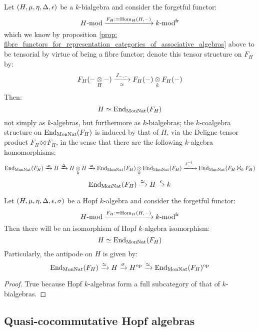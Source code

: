         \begin{proposition} \label{prop: fibre_functors_for_representation_categories_of_bialgebras}
            Let $(H, \mu, \eta, \Delta, \epsilon)$ be a $k$-bialgebra and consider the forgetful functor:
                $$H\text{-}\mathrm{mod} \xrightarrow[]{F_H := \mathrm{Hom}_H(H, -)} k\text{-}\mathrm{mod}^{\mathrm{fr}}$$
            which we know by proposition \ref{prop: fibre_functors_for_representation_categories_of_associative_algebras} above to be tensorial by virtue of being a fibre functor; denote this tensor structure on $F_H$ by:
                $$F_H(- \tensor_H -) \xrightarrow[\cong]{J_{-, -}} F_H(-) \tensor_k F_H(-)$$
            Then:
                $$H \simeq \mathrm{End}_{\mathrm{Mon}\mathrm{Nat}}(F_H)$$
            not simply as $k$-algebras, but furthermore as $k$-bialgebras; the $k$-coalgebra structure on $\mathrm{End}_{\mathrm{Mon}\mathrm{Nat}}(F_H)$ is induced by that of $H$, via the Deligne tensor product $F_H \boxtimes F_H$, in the sense that there are the following $k$-algebra homomorphisms:
                $$\End_{\Mon\Nat}(F_H) \xrightarrow[]{\cong} H \xrightarrow[]{\Delta} H \tensor_k H \xrightarrow[]{\cong} \End_{\Mon\Nat}(F_H) \tensor_k \End_{\Mon\Nat}(F_H) \xrightarrow[]{J_{-, -}^{-1}} \End_{\Mon\Nat}(F_H \boxtimes_k F_H)$$
                $$\mathrm{End}_{\mathrm{Mon}\mathrm{Nat}}(F_H) \xrightarrow[]{\simeq} H \xrightarrow[]{\epsilon} k$$
        \end{proposition}
        \begin{corollary} \label{coro: fibre_functors_for_representation_categories_of_hopf_algebras}
            Let $(H, \mu, \eta, \Delta, \epsilon, \sigma)$ be a Hopf $k$-algebra and consider the forgetful functor:
                $$H\text{-}\mathrm{mod} \xrightarrow[]{F_H := \mathrm{Hom}_H(H, -)} k\text{-}\mathrm{mod}^{\mathrm{fr}}$$
            Then there will be an isomorphism of Hopf $k$-algebra isomorphism:
                $$H \simeq \mathrm{End}_{\mathrm{Mon}\mathrm{Nat}}(F_H)$$
            Particularly, the antipode on $H$ is given by:
                $$\mathrm{End}_{\mathrm{Mon}\mathrm{Nat}}(F_H) \xrightarrow[]{\simeq} H \xrightarrow[]{\sigma} H^{\mathrm{op}} \xrightarrow[]{\simeq} \mathrm{End}_{\mathrm{Mon}\mathrm{Nat}}(F_H)^{\mathrm{op}}$$
        \end{corollary}
            \begin{proof}
                True because Hopf $k$-algebras form a full subcategory of that of $k$-bialgebras. 
            \end{proof}
    
    \subsection{Quasi-cocommutative Hopf algebras}
    
